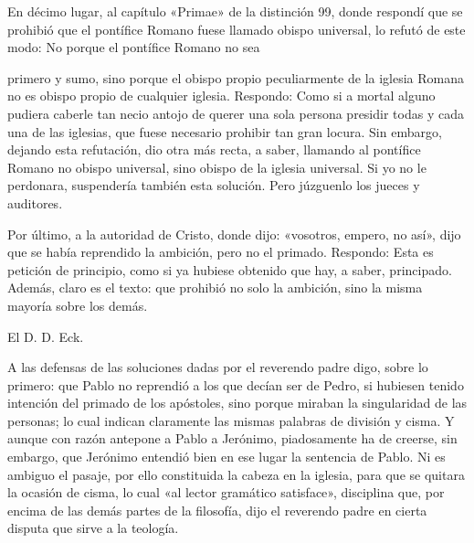En décimo lugar, al capítulo «Primae» de la distinción 99, donde respondí que se prohibió que el pontífice Romano fuese llamado obispo universal, lo refutó de este modo: No porque el pontífice Romano no sea

primero y sumo, sino porque el obispo propio peculiarmente de la iglesia Romana no es obispo propio de cualquier iglesia. Respondo: Como si a mortal alguno pudiera caberle tan necio antojo de querer una sola persona presidir todas y cada una de las iglesias, que fuese necesario prohibir tan gran locura. Sin embargo, dejando esta refutación, dio otra más recta, a saber, llamando al pontífice Romano no obispo universal, sino obispo de la iglesia universal. Si yo no le perdonara, suspendería también esta solución. Pero júzguenlo los jueces y auditores.

Por último, a la autoridad de Cristo, donde dijo: «vosotros, empero, no así», dijo que se había reprendido la ambición, pero no el primado. Respondo: Esta es petición de principio, como si ya hubiese obtenido que hay, a saber, principado. Además, claro es el texto: que prohibió no solo la ambición, sino la misma mayoría sobre los demás.

El D. D. Eck.

A las defensas de las soluciones dadas por el reverendo padre digo, sobre lo primero: que Pablo no reprendió a los que decían ser de Pedro, si hubiesen tenido intención del primado de los apóstoles, sino porque miraban la singularidad de las personas; lo cual indican claramente las mismas palabras de división y cisma. Y aunque con razón antepone a Pablo a Jerónimo, piadosamente ha de creerse, sin embargo, que Jerónimo entendió bien en ese lugar la sentencia de Pablo. Ni es ambiguo el pasaje, por ello constituida la cabeza en la iglesia, para que se quitara la ocasión de cisma, lo cual «al lector gramático satisface», disciplina que, por encima de las demás partes de la filosofía, dijo el reverendo padre en cierta disputa que sirve a la teología.

